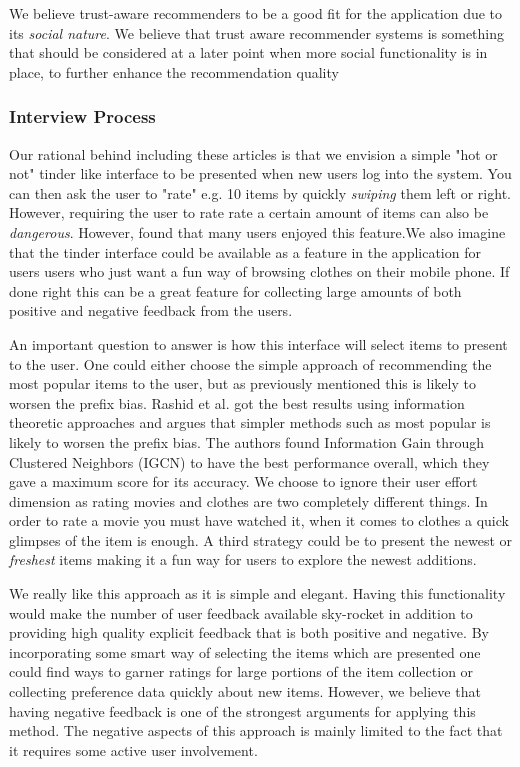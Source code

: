 We believe trust-aware recommenders to be a good fit for the application
due to its \emph{social nature}. We believe that trust aware recommender systems
is something that should be considered at a later point when more social functionality
is in place, to further enhance the recommendation quality

\subsubsection{Interview Process}

Our rational behind including these articles is that we envision a simple "hot
or not" tinder like interface to be presented when new users log into the system.
You can then ask the user to "rate" e.g. 10 items by quickly \emph{swiping} them
left or right. However, requiring the user to rate rate a certain amount of items
can also be \emph{dangerous}. However, \cite{SuitUp} found that many users
enjoyed this feature.We also imagine that the tinder interface
could be available as a feature in the application for users users who just want a
fun way of browsing clothes on their mobile phone. If done right this can be
a great feature for collecting large amounts of both positive and negative feedback
from the users.

An important question to answer is how this interface will select items to
present to the user. One could either choose the simple approach of
recommending the most popular items to the user, but as previously mentioned
this is likely to worsen the prefix bias. Rashid et al. \cite{Rashid2008} got
the best results using information theoretic approaches and argues that simpler
methods such as most popular is likely to worsen the prefix bias. The authors
found Information Gain through Clustered Neighbors (IGCN) to have the best
performance overall, which they gave a maximum score for its accuracy. We choose
to ignore their user effort dimension as rating movies and clothes are two
completely different things. In order to rate a movie you must have watched
it, when it comes to clothes a quick glimpses of the item is enough.
A third strategy could be to present the newest or \emph{freshest} items
making it a fun way for users to explore the newest additions.

We really like this approach as it is simple and elegant. Having this
functionality would make the number of user feedback available sky-rocket in addition
to providing high quality explicit feedback that is both positive and negative.
By incorporating some smart way of selecting the items which are presented
one could find ways to garner ratings for large portions of the item collection
or collecting preference data quickly about new items. However, we believe
that having negative feedback is one of the strongest arguments for applying
this method. The negative aspects of this approach is mainly limited to the fact
that it requires some active user involvement.

